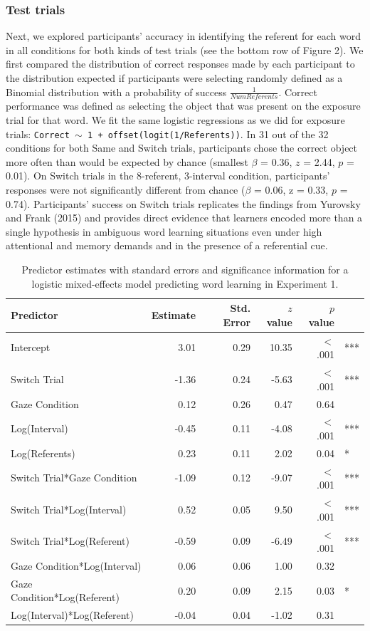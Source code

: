 \documentclass[authoryear, review]{elsarticle}
\begin{document}
\subsubsection{Test trials}\label{test-trials}

Next, we explored participants' accuracy in identifying the referent for
each word in all conditions for both kinds of test trials (see the
bottom row of Figure 2). We first compared the distribution of correct
responses made by each participant to the distribution expected if
participants were selecting randomly defined as a Binomial distribution
with a probability of success \(\frac{1}{Num Referents}\). Correct
performance was defined as selecting the object that was present on the
exposure trial for that word. We fit the same logistic regressions as we
did for exposure trials:
\texttt{Correct $\sim$ 1 + offset(logit(1/Referents))}. In 31 out of the
32 conditions for both Same and Switch trials, participants chose the
correct object more often than would be expected by chance (smallest
\(\beta\) = 0.36, \(z\) = 2.44, \(p\) = 0.01). On Switch trials in the
8-referent, 3-interval condition, participants' responses were not
significantly different from chance (\(\beta\) = 0.06, z = 0.33, \(p\) =
0.74). Participants' success on Switch trials replicates the findings
from Yurovsky and Frank (2015) and provides direct evidence that
learners encoded more than a single hypothesis in ambiguous word
learning situations even under high attentional and memory demands and
in the presence of a referential cue.

\begin{table}[tb]
\centering
\begin{tabular}{lrrrrl}
 Predictor & Estimate & Std. Error & $z$ value & $p$ value &  \\ 
  \hline
Intercept & 3.01 & 0.29 & 10.35 & $<$ .001 & *** \\ 
  Switch Trial & -1.36 & 0.24 & -5.63 & $<$ .001 & *** \\ 
  Gaze Condition & 0.12 & 0.26 & 0.47 & 0.64 &  \\ 
  Log(Interval) & -0.45 & 0.11 & -4.08 & $<$ .001 & *** \\ 
  Log(Referents) & 0.23 & 0.11 & 2.02 & 0.04 & * \\ 
  Switch Trial*Gaze Condition & -1.09 & 0.12 & -9.07 & $<$ .001 & *** \\ 
  Switch Trial*Log(Interval) & 0.52 & 0.05 & 9.50 & $<$ .001 & *** \\ 
  Switch Trial*Log(Referent) & -0.59 & 0.09 & -6.49 & $<$ .001 & *** \\ 
  Gaze Condition*Log(Interval) & 0.06 & 0.06 & 1.00 & 0.32 &  \\ 
  Gaze Condition*Log(Referent) & 0.20 & 0.09 & 2.15 & 0.03 & * \\ 
  Log(Interval)*Log(Referent) & -0.04 & 0.04 & -1.02 & 0.31 &  \\ 
   \hline
\end{tabular}
\caption{Predictor estimates with standard errors and significance information for a logistic mixed-effects model predicting word learning in Experiment 1.} 
\label{tab:exp1_reg}
\end{table}
\end{document}
